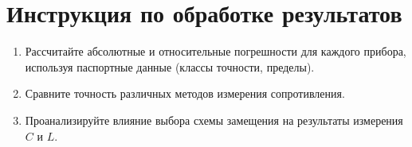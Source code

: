 \section*{Инструкция по обработке результатов}
\begin{enumerate}
    \item Рассчитайте абсолютные и относительные погрешности для каждого прибора, используя паспортные данные (классы точности, пределы).
    \item Сравните точность различных методов измерения сопротивления.
    \item Проанализируйте влияние выбора схемы замещения на результаты измерения $C$ и $L$.
\end{enumerate}
